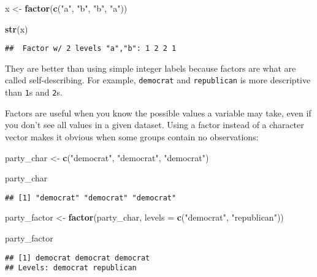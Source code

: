 \documentclass[
]{book}
\newenvironment{Shaded}{\begin{snugshade}}{\end{snugshade}}
\newcommand{\DataTypeTok}[1]{\textcolor[rgb]{0.13,0.29,0.53}{#1}}
\newcommand{\KeywordTok}[1]{\textcolor[rgb]{0.13,0.29,0.53}{\textbf{#1}}}
\newcommand{\NormalTok}[1]{#1}
\newcommand{\StringTok}[1]{\textcolor[rgb]{0.31,0.60,0.02}{#1}}
\begin{document}
\begin{Shaded}
\begin{Highlighting}[]
\NormalTok{x \textless{}{-}}\StringTok{ }\KeywordTok{factor}\NormalTok{(}\KeywordTok{c}\NormalTok{(}\StringTok{"a"}\NormalTok{, }\StringTok{"b"}\NormalTok{, }\StringTok{"b"}\NormalTok{, }\StringTok{"a"}\NormalTok{))}

\KeywordTok{str}\NormalTok{(x)}
\end{Highlighting}
\end{Shaded}

\begin{verbatim}
##  Factor w/ 2 levels "a","b": 1 2 2 1
\end{verbatim}

They are better than using simple integer labels because factors are what are called self-describing. For example, \texttt{democrat} and \texttt{republican} is more descriptive than \texttt{1}s and \texttt{2}s.

Factors are useful when you know the possible values a variable may take, even if you don't see all values in a given dataset. Using a factor instead of a character vector makes it obvious when some groups contain no observations:

\begin{Shaded}
\begin{Highlighting}[]
\NormalTok{party\_char \textless{}{-}}\StringTok{ }\KeywordTok{c}\NormalTok{(}\StringTok{"democrat"}\NormalTok{, }\StringTok{"democrat"}\NormalTok{, }\StringTok{"democrat"}\NormalTok{)}

\NormalTok{party\_char}
\end{Highlighting}
\end{Shaded}

\begin{verbatim}
## [1] "democrat" "democrat" "democrat"
\end{verbatim}

\begin{Shaded}
\begin{Highlighting}[]
\NormalTok{party\_factor \textless{}{-}}\StringTok{ }\KeywordTok{factor}\NormalTok{(party\_char, }\DataTypeTok{levels =} \KeywordTok{c}\NormalTok{(}\StringTok{"democrat"}\NormalTok{, }\StringTok{"republican"}\NormalTok{))}

\NormalTok{party\_factor}
\end{Highlighting}
\end{Shaded}

\begin{verbatim}
## [1] democrat democrat democrat
## Levels: democrat republican
\end{verbatim}
\end{document}
